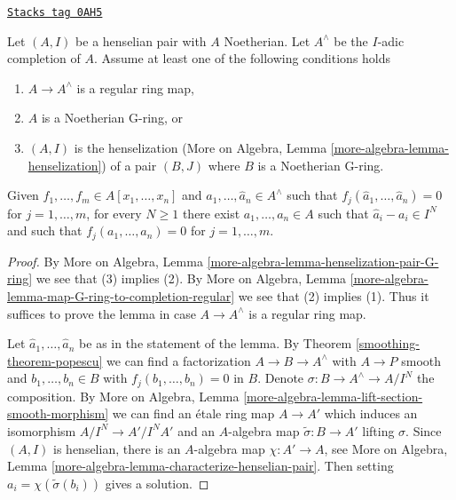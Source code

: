 \begin{lemma}
\label{smoothing-lemma-henselian-pair}
\href{https://stacks.math.columbia.edu/tag/0AH5}{\texttt{Stacks tag 0AH5}}


Let $(A, I)$ be a henselian pair with $A$ Noetherian.
Let $A^\wedge$ be the $I$-adic completion
of $A$. Assume at least one of the following
conditions holds
\begin{enumerate}
\item $A \to A^\wedge$ is a regular ring map,
\item $A$ is a Noetherian G-ring, or
\item $(A, I)$ is the henselization
(More on Algebra, Lemma \ref{more-algebra-lemma-henselization})
of a pair $(B, J)$ where $B$ is a Noetherian G-ring.
\end{enumerate}
Given $f_1, \ldots, f_m \in A[x_1, \ldots, x_n]$
and $\hat{a}_1, \ldots, \hat{a}_n \in A^\wedge$ such that
$f_j(\hat{a}_1, \ldots, \hat{a}_n) = 0$
for $j = 1, \ldots, m$, for every $N \geq 1$ there exist
$a_1, \ldots, a_n \in A$ such that
$\hat{a}_i - a_i \in I^N$ and such that $f_j(a_1, \ldots, a_n) = 0$
for $j = 1, \ldots, m$.
\end{lemma}

\begin{proof}

By More on Algebra, Lemma
\ref{more-algebra-lemma-henselization-pair-G-ring}
we see that (3) implies (2). By More on Algebra, Lemma
\ref{more-algebra-lemma-map-G-ring-to-completion-regular}
we see that (2) implies (1).
Thus it suffices to prove the lemma in case $A \to A^\wedge$ is
a regular ring map.

\medskip\noindent
Let $\hat{a}_1, \ldots, \hat{a}_n$ be as in the statement of the lemma.
By Theorem \ref{smoothing-theorem-popescu} we can find a factorization
$A \to B \to A^\wedge$ with $A \to P$ smooth and
$b_1, \ldots, b_n \in B$ with $f_j(b_1, \ldots, b_n) = 0$ in $B$.
Denote $\sigma : B \to A^\wedge \to A/I^N$ the composition.
By More on Algebra, Lemma \ref{more-algebra-lemma-lift-section-smooth-morphism}
we can find an \'etale ring
map $A \to A'$ which induces an isomorphism $A/I^N \to A'/I^NA'$
and an $A$-algebra map $\tilde \sigma : B \to A'$ lifting $\sigma$.
Since $(A, I)$ is henselian, there is an $A$-algebra map $\chi : A' \to A$,
see More on Algebra, Lemma \ref{more-algebra-lemma-characterize-henselian-pair}.
Then setting $a_i = \chi(\tilde \sigma(b_i))$ gives a solution.
\end{proof}



